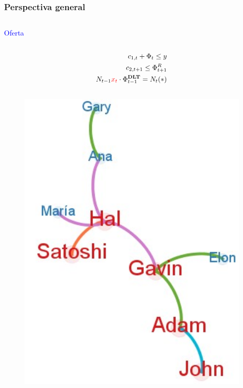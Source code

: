 \begin{frame}[plain]
\frametitle{Perspectiva general}
\begin{columns}


    \begin{column}{0.50\textwidth}
    \vspace{-5pt}
    \begin{block}{\textcolor{blue}{Oferta}}
        \begin{column}{0.1\textwidth}
        \vspace{-10pt} %
            \tiny
            \begin{align*}
            c_{1,t}+\Phi_t \le y\\
            c_{2,t+1}\le\Phi_{t+1}^R\\
            N_{t-1}\textcolor{red}{x_t} \cdot \Phi_{t-1}^{\textbf{DLT}}=N_t(*)
            \end{align*}
        \end{column}
        \begin{column}{0.35\textwidth}  
            \begin{figure}[H]
            \begin{center}
             \includegraphics[width=1\textwidth]{images/C2/c2_simul_red5.jpg}
             \end{center}
            \end{figure}
            \end{column}
    \end{block}
    

\end{column}
\end{columns}
\end{frame}
